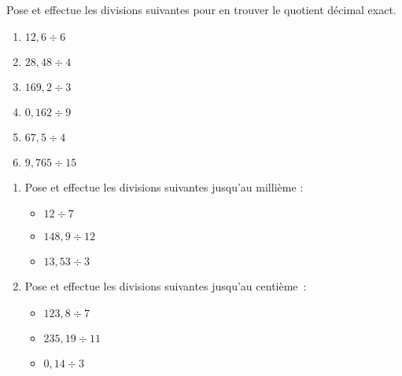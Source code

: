 \begin{exercice} %
Pose et effectue les divisions suivantes pour en trouver le quotient décimal exact.
\begin{enumerate} 
 \item $ 12,6 \div 6$ \dotfill \hspace*{11em}
 
 \item $ 28,48 \div 4$ \dotfill \hspace*{11em}

 \item $ 169,2 \div 3$ \dotfill \hspace*{11em}

 \item $ 0,162 \div 9$ \dotfill \hspace*{11em}

 \item $ 67,5 \div 4$ \dotfill \hspace*{11em}

 \item $ 9,765 \div 15$ \dotfill \hspace*{11em}
 
 \end{enumerate}
\end{exercice}


\begin{exercice} %
\begin{enumerate} 
 \item Pose et effectue les divisions suivantes jusqu'au millième :
 \begin{itemize}
  \item $12 \div 7$ \dotfill \hspace*{10em}
  
  \item $148,9 \div 12$ \dotfill \hspace*{10em}
  
  \item $13,53 \div 3$ \dotfill \hspace*{10em}
  
  \end{itemize}
 \item Pose et effectue les divisions suivantes jusqu'au centième :
  \begin{itemize}
  \item $123,8 \div 7$ \dotfill \hspace*{10em}
  
  \item $235,19 \div 11$ \dotfill \hspace*{10em}
  
  \item $0,14 \div 3$ \dotfill \hspace*{10em}
  
  \end{itemize}
 \end{enumerate}
\end{exercice}


